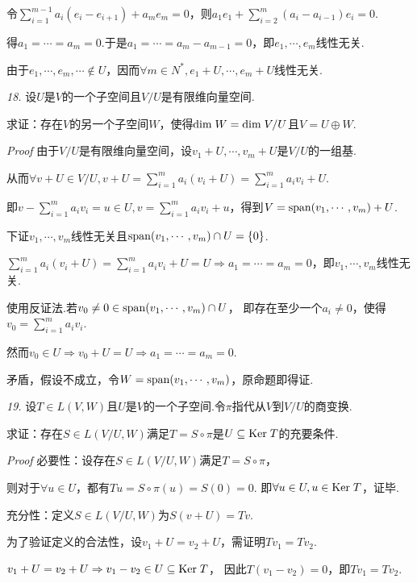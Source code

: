 令\(\sum_{i=1}^{m-1} a_i(e_i-e_{i+1})+a_me_m=0\)，则\(a_1e_1+\sum_{i=2}^m(a_i-a_{i-1})e_i=0\).

得\(a_1=\cdots=a_m=0\).于是\(a_1=\cdots=a_m-a_{m-1}=0\)，即\(e_1,\cdots,e_m\)线性无关.

由于\(e_1,\cdots,e_m,\cdots \notin U\)，因而\(\forall m \in N^*,e_1+U,\cdots,e_m+U\)线性无关.

\newpage

\textit{18.}
设\(U\)是\(V\)的一个子空间且\(V/U\)是有限维向量空间.

求证：存在\(V\)的另一个子空间\(W\)，使得\(\mathrm{dim \;} W=\mathrm{dim \;} V/U\)且\(V=U \oplus W\).

\textit{Proof}
由于\(V/U\)是有限维向量空间，设\(v_1+U,\cdots,v_m+U\)是\(V/U\)的一组基.

从而\(\forall v+U \in V/U,v+U=\sum_{i=1}^m a_i(v_i+U)=\sum_{i=1}^m a_iv_i+U\).

即\(v-\sum_{i=1}^m a_iv_i=u \in U,v=\sum_{i=1}^m a_iv_i+u\)，得到\(V=\mathrm{span} (v_1,\cdots,v_m)+U\).

下证\(v_1,\cdots,v_m\)线性无关且\(\mathrm{span} (v_1,\cdots,v_m) \cap U =\{0\}\).

\(\sum_{i=1}^m a_i(v_i+U)=\sum_{i=1}^m a_iv_i+U=U \Rightarrow a_1=\cdots=a_m=0\)，即\(v_1,\cdots,v_m\)线性无关.

使用反证法.若\(v_0 \ne 0 \in \mathrm{span} (v_1,\cdots,v_m) \cap U\)，
即存在至少一个\(a_i \ne 0\)，使得\(v_0=\sum_{i=1}^m a_iv_i\).

然而\(v_0 \in U \Rightarrow v_0+U=U \Rightarrow a_1=\cdots=a_m=0\).

矛盾，假设不成立，令\(W=\mathrm{span} (v_1,\cdots,v_m)\)，原命题即得证.

\hspace*{\fill}

\textit{19.}
设\(T \in L(V,W)\)且\(U\)是\(V\)的一个子空间.令\(\pi\)指代从\(V\)到\(V/U\)的商变换.

求证：存在\(S \in L(V/U,W)\)满足\(T=S \circ \pi\)是\(U \subseteq \mathrm{Ker \;} T\)的充要条件.

\textit{Proof}
必要性：设存在\(S \in L(V/U,W)\)满足\(T=S \circ \pi\)，

则对于\(\forall u \in U\)，都有\(Tu=S \circ \pi(u)=S(0)=0\).
即\(\forall u \in U,u \in \mathrm{Ker \;} T\)，证毕.

充分性：定义\(S \in L(V/U,W)\)为\(S(v+U)=Tv\).

为了验证定义的合法性，设\(v_1+U=v_2+U\)，需证明\(Tv_1=Tv_2\).

\(v_1+U=v_2+U \Rightarrow v_1-v_2 \in U \subseteq \mathrm{Ker \;} T\)，
因此\(T(v_1-v_2)=0\)，即\(Tv_1=Tv_2\).

